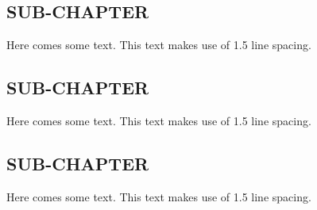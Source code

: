 \documentclass[fontsize=11pt]{scrartcl}
\begin{document}
\subsection{SUB-CHAPTER}
Here comes some text. This text makes use of 1.5 line spacing. 
\subsection{SUB-CHAPTER}
Here comes some text. This text makes use of 1.5 line spacing. 
\subsection{SUB-CHAPTER}
Here comes some text. This text makes use of 1.5 line spacing. 
\pagebreak
\end{document}
